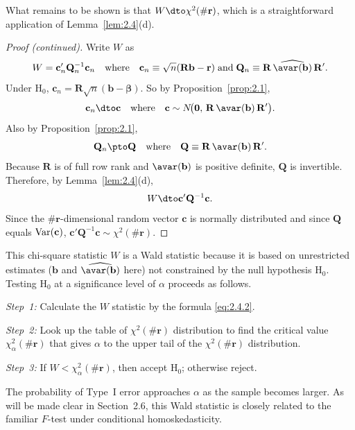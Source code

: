 What remains to be shown is that $W \dto \chi^2(\#\mathbf{r})$, which is a
straightforward application of Lemma~\ref{lem:2.4}(d).

\begin{proof}[Proof (continued)]
Write $W$ as
\[
  W = \mathbf{c}_n'\mathbf{Q}_n^{-1}\mathbf{c}_n
  \quad \text{where} \quad
  \mathbf{c}_n \equiv \sqrt{n}(\mathbf{R}\mathbf{b} - \mathbf{r})
  \;\text{and}\;
  \mathbf{Q}_n \equiv \mathbf{R}\,\widehat{\avar(\mathbf{b})}\,\mathbf{R}'.
\]
Under $\mathrm{H}_0$,
$\mathbf{c}_n = \mathbf{R}\sqrt{n}(\mathbf{b} - \bm{\beta})$.  So by
Proposition~\ref{prop:2.1},
\[
  \mathbf{c}_n \dto \mathbf{c} \quad \text{where} \quad
  \mathbf{c} \sim N\!\big(\mathbf{0},\,
  \mathbf{R}\,\avar(\mathbf{b})\,\mathbf{R}'\big).
\]
Also by Proposition~\ref{prop:2.1},
\[
  \mathbf{Q}_n \pto \mathbf{Q} \quad \text{where} \quad
  \mathbf{Q} \equiv \mathbf{R}\,\avar(\mathbf{b})\,\mathbf{R}'.
\]
Because $\mathbf{R}$ is of full row rank and $\avar(\mathbf{b})$ is positive
definite, $\mathbf{Q}$ is invertible.  Therefore, by Lemma~\ref{lem:2.4}(d),
\[
  W \dto \mathbf{c}'\mathbf{Q}^{-1}\mathbf{c}.
\]
Since the $\#\mathbf{r}$-dimensional random vector $\mathbf{c}$ is normally
distributed and since $\mathbf{Q}$ equals $\operatorname{Var}(\mathbf{c})$,
$\mathbf{c}'\mathbf{Q}^{-1}\mathbf{c} \sim \chi^2(\#\mathbf{r})$.
\end{proof}

This chi-square statistic $W$ is a Wald statistic because it is based on unrestricted
estimates ($\mathbf{b}$ and $\widehat{\avar(\mathbf{b})}$ here) not constrained by
the null hypothesis $\mathrm{H}_0$.  Testing $\mathrm{H}_0$ at a significance level
of $\alpha$ proceeds as follows.

\smallskip
\noindent\emph{Step~1:} Calculate the $W$ statistic by the formula \eqref{eq:2.4.2}.

\noindent\emph{Step~2:} Look up the table of $\chi^2(\#\mathbf{r})$ distribution to
find the critical value $\chi_\alpha^2(\#\mathbf{r})$ that gives $\alpha$ to the upper
tail of the $\chi^2(\#\mathbf{r})$ distribution.

\noindent\emph{Step~3:} If $W < \chi_\alpha^2(\#\mathbf{r})$, then accept
$\mathrm{H}_0$; otherwise reject.

\smallskip
The probability of Type~I error approaches $\alpha$ as the sample becomes larger.
As will be made clear in Section~2.6, this Wald statistic is closely related to the
familiar $F$-test under conditional homoskedasticity.

